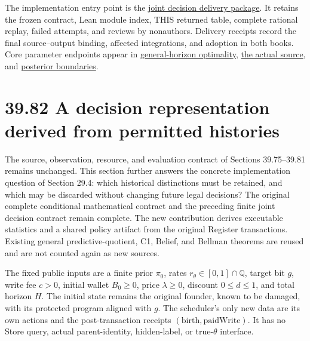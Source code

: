 \documentclass[
  english,
  11pt,
  oneside]{book}
\begin{document}
The implementation entry point is the \href{../formalization/ueot-core/docs/compression/theory_completion/unified_closure/joint_decision_closure_v1/README.md}{joint decision delivery package}. It retains the frozen contract, Lean module index, THIS returned table, complete rational replay, failed attempts, and reviews by nonauthors. Delivery receipts record the final source--output binding, affected integrations, and adoption in both books. Core parameter endpoints appear in \href{../formalization/ueot-core/UEOT/V3/Compression/TheoryCompletion/UnifiedClosure/RegisterJointDecisionOptimality.lean}{general-horizon optimality}, \href{../formalization/ueot-core/UEOT/V3/Compression/TheoryCompletion/UnifiedClosure/RegisterJointDecisionSource.lean}{the actual source}, and \href{../formalization/ueot-core/UEOT/V3/Compression/TheoryCompletion/UnifiedClosure/RegisterJointDecisionBoundary.lean}{posterior boundaries}.

\section{39.82 A decision representation derived from permitted histories}\label{a-decision-representation-derived-from-permitted-histories}

The source, observation, resource, and evaluation contract of Sections 39.75--39.81 remains unchanged. This section further answers the concrete implementation question of Section 29.4: which historical distinctions must be retained, and which may be discarded without changing future legal decisions? The original complete conditional mathematical contract and the preceding finite joint decision contract remain complete. The new contribution derives executable statistics and a shared policy artifact from the original Register transactions. Existing general predictive-quotient, C1, Belief, and Bellman theorems are reused and are not counted again as new sources.

The fixed public inputs are a finite prior \(\pi_0\), rates \(r_\theta\in[0,1]\cap\mathbb Q\), target bit \(g\), write fee \(c>0\), initial wallet \(B_0\ge0\), price \(\lambda\ge0\), discount \(0\le d\le1\), and total horizon \(H\). The initial state remains the original founder, known to be damaged, with its protected program aligned with \(g\). The scheduler's only new data are its own actions and the post-transaction receipts \((\mathrm{birth},\mathrm{paidWrite})\). It has no Store query, actual parent-identity, hidden-label, or true-\(\theta\) interface.
\end{document}
